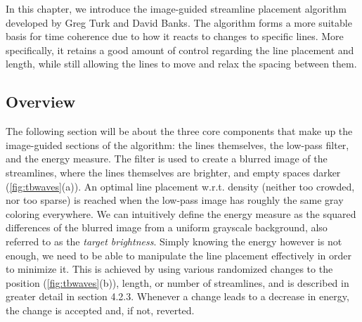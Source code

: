 In this chapter, we introduce the image-guided streamline placement algorithm developed by Greg Turk and David Banks.
The algorithm forms a more suitable basis for time coherence due to how it reacts to changes to specific lines.
More specifically, it retains a good amount of control regarding the line placement and length,
while still allowing the lines to move and relax the spacing between them.

\subsection{Overview}
The following section will be about the three core components that make up the image-guided sections of the algorithm: the lines themselves, the low-pass filter, and the energy measure.
The filter is used to create a blurred image of the streamlines,
where the lines themselves are brighter, and empty spaces darker (\cref{fig:tbwaves}(a)).
An optimal line placement w.r.t. density (neither too crowded, nor too sparse) is reached when the low-pass image has roughly the same gray coloring everywhere.
We can intuitively define the energy measure as the squared differences of the blurred image from
a uniform grayscale background, also referred to as the \textit{target brightness}.
Simply knowing the energy however is not enough, we need to be able to manipulate the line placement effectively in order to minimize it.
This is achieved by using various randomized changes to the position (\cref{fig:tbwaves}(b)), length, or number of streamlines, and is described in greater detail in section 4.2.3.
Whenever a change leads to a decrease in energy, the change is accepted and, if not, reverted.

